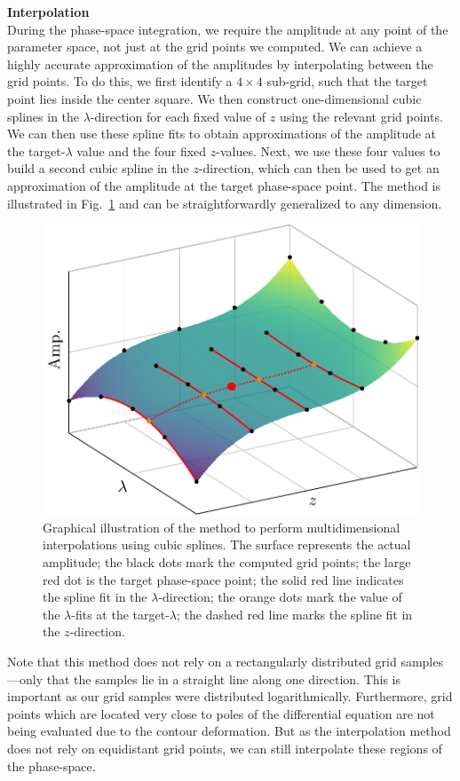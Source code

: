 \textbf{Interpolation}\\
During the phase-space integration, we require the amplitude at any point of the parameter space, not just at the grid points we computed. We can achieve a highly accurate approximation of the amplitudes by interpolating between the grid points. To do this, we first identify a $4\times 4$ sub-grid, such that the target point lies inside the center square. We then construct one-dimensional cubic splines in the $\lambda$-direction for each fixed value of $z$ using the relevant grid points. We can then use these spline fits to obtain approximations of the amplitude at the target-$\lambda$ value and the four fixed $z$-values. Next, we use these four values to build a second cubic spline in the $z$-direction, which can then be used to get an approximation of the amplitude at the target phase-space point. The method is illustrated in Fig.~\ref{fig:5:interpolation} and can be straightforwardly generalized to any dimension.
\begin{figure}[ht]
\centering
\includegraphics[scale=0.6]{Images/interpolation.pdf}
\caption{Graphical illustration of the method to perform multidimensional interpolations using cubic splines. The surface represents the actual amplitude; the black dots mark the computed grid points; the large red dot is the target phase-space point; the solid red line indicates the spline fit in the $\lambda$-direction; the orange dots mark the value of the $\lambda$-fits at the target-$\lambda$; the dashed red line marks the spline fit in the $z$-direction.}
\label{fig:5:interpolation}
\end{figure}
Note that this method does not rely on a rectangularly distributed grid samples---only that the samples lie in a straight line along one direction. This is important as our grid samples were distributed logarithmically. Furthermore, grid points which are located very close to poles of the differential equation are not being evaluated due to the contour deformation. But as the interpolation method does not rely on equidistant grid points, we can still interpolate these regions of the phase-space.

